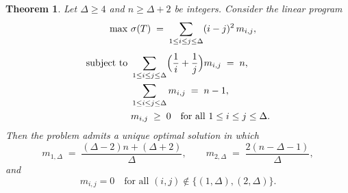 \documentclass[10pt,a4paper]{amsart}
\newtheorem{theorem}{Theorem}
\begin{document}
\begin{theorem}
\label{thm:SO-LP-1-Delta}
Let $\Delta\ge 4$ and $n\ge \Delta+2$ be integers. Consider the linear program
\begin{align}
\max\ & \sigma(T) \;=\; \sum_{1\le i\le j\le \Delta} (i-j)^2\, m_{i,j},
\label{eq:primal-objective}\\[1ex]
\text{subject to }&
\sum_{1\le i\le j\le \Delta} \Bigl(\frac{1}{i}+\frac{1}{j}\Bigr) m_{i,j} \;=\; n,
\label{eq:primal-constraint-w}\\
&
\sum_{1\le i\le j\le \Delta} m_{i,j} \;=\; n-1,
\label{eq:primal-constraint-sum}\\
&
m_{i,j}\;\ge\; 0
\quad\text{for all }1\le i\le j\le \Delta.
\label{eq:primal-nonneg}
\end{align}
Then the problem admits a unique optimal solution in which
\[
m_{1,\Delta} \;=\; \frac{(\Delta-2)n + (\Delta+2)}{\Delta}, 
\qquad
m_{2,\Delta} \;=\; \frac{2(n-\Delta-1)}{\Delta},
\]
and
\[
m_{i,j}=0 \quad\text{for all } (i,j)\notin\{(1,\Delta),(2,\Delta)\}.
\]
\end{theorem}
\end{document}
